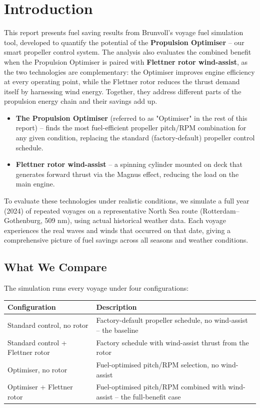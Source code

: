 \documentclass[a4paper,11pt]{article}
\author{Frode Bloch}
\date{\today}
\title{}
\begin{document}
\bvMainTitlePage
\tableofcontents
\newpage

\section{Introduction}
\label{sec:org4a94b4d}

This report presents fuel saving results from Brunvoll's voyage fuel
simulation tool, developed to quantify the potential of the \textbf{Propulsion
Optimiser} -- our smart propeller control system.  The analysis also evaluates
the combined benefit when the Propulsion Optimiser is paired with \textbf{Flettner
rotor wind-assist}, as the two technologies are complementary: the Optimiser
improves engine efficiency at every operating point, while the Flettner rotor
reduces the thrust demand itself by harnessing wind energy.  Together, they
address different parts of the propulsion energy chain and their savings add
up.

\begin{itemize}
\item \textbf{The Propulsion Optimiser} (referred to as "Optimiser" in the rest of this
report) -- finds the most fuel-efficient propeller pitch/RPM combination for
any given condition, replacing the standard (factory-default) propeller
control schedule.

\item \textbf{Flettner rotor wind-assist} -- a spinning cylinder mounted on deck that
generates forward thrust via the Magnus effect, reducing the load on the main
engine.
\end{itemize}

To evaluate these technologies under realistic conditions, we simulate a full
year (2024) of repeated voyages on a representative North Sea route
(Rotterdam--Gothenburg, 509 nm), using actual historical weather data.  Each
voyage experiences the real waves and winds that occurred on that date, giving
a comprehensive picture of fuel savings across all seasons and weather
conditions.

\subsection{What We Compare}
\label{sec:org1382902}

The simulation runs every voyage under four configurations:

\begin{center}
\begin{tabular}{lp{8cm}}
\toprule
Configuration & Description\\[0pt]
\midrule
Standard control, no rotor & Factory-default propeller schedule, no wind-assist -- the baseline\\[0pt]
Standard control + Flettner rotor & Factory schedule with wind-assist thrust from the rotor\\[0pt]
Optimiser, no rotor & Fuel-optimised pitch/RPM selection, no wind-assist\\[0pt]
Optimiser + Flettner rotor & Fuel-optimised pitch/RPM combined with wind-assist -- the full-benefit case\\[0pt]
\bottomrule
\end{tabular}
\end{center}
\end{document}
